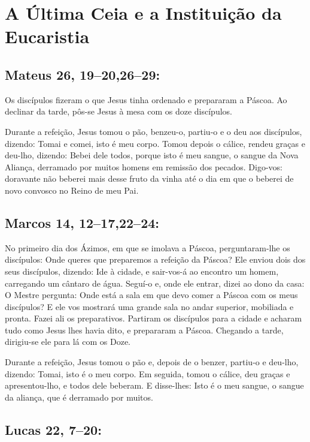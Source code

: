 \documentclass[10pt,a5paper]{book}
\newcommand{\from}[1]{\subsection*{#1}}
\begin{document}

\section{A Última Ceia e a Instituição da Eucaristia}

\from{Mateus 26, 19--20,26--29:}

Os discípulos fizeram o que Jesus tinha ordenado e prepararam a Páscoa.
Ao declinar da tarde, pôs-se Jesus à mesa com os doze discípulos.

Durante a refeição, Jesus tomou o pão, benzeu-o, partiu-o e o deu aos discípulos, dizendo:
Tomai e comei, isto é meu corpo.
Tomou depois o cálice, rendeu graças e deu-lho, dizendo:
Bebei dele todos, porque isto é meu sangue, o sangue da Nova Aliança, derramado por muitos homens em remissão dos pecados.
Digo-vos:
doravante não beberei mais desse fruto da vinha até o dia em que o beberei de novo convosco no Reino de meu Pai.

\from{Marcos 14, 12--17,22--24:}

No primeiro dia dos Ázimos, em que se imolava a Páscoa, perguntaram-lhe os discípulos:
Onde queres que preparemos a refeição da Páscoa?
Ele enviou dois dos seus discípulos, dizendo: Ide à cidade, e sair-vos-á ao encontro um homem, carregando um cântaro de água.
Seguí-o e, onde ele entrar, dizei ao dono da casa:
O Mestre pergunta: Onde está a sala em que devo comer a Páscoa com os meus discípulos?
E ele vos mostrará uma grande sala no andar superior, mobiliada e pronta.
Fazei ali os preparativos.
Partiram os discípulos para a cidade e acharam tudo como Jesus lhes havia dito, e prepararam a Páscoa.
Chegando a tarde, dirigiu-se ele para lá com os Doze.

Durante a refeição, Jesus tomou o pão e, depois de o benzer, partiu-o e deu-lho, dizendo:
Tomai, isto é o meu corpo.
Em seguida, tomou o cálice, deu graças e apresentou-lho, e todos dele beberam.
E disse-lhes:
Isto é o meu sangue, o sangue da aliança, que é derramado por muitos.

\from{Lucas 22, 7--20:}
\end{document}
